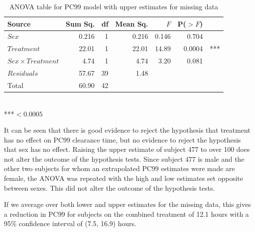 \begin{table}[h]
\centering
\caption{ANOVA table for PC99 model with upper estimates for missing data}\label{aov99high}
\begin{tabular}{l|rrrrrl}
Source&Sum Sq.&df&Mean Sq.&$F$&P($>F$)\\
\hline
$Sex$				& 0.216 & 1 & 0.216 & 0.146 & 0.704 & \\
$Treatment$			& 22.01   & 1 & 22.01   & 14.89   & 0.0004 &*** \\
$Sex\times Treatment$	& 4.74   & 1 & 4.74   & 3.20   & 0.081 & \\
$Residuals$			& 57.67 & 39 & 1.48 &&&\\
\hline
Total&60.90&42&&&
\end{tabular}\\
***$<0.0005$
\end{table}

It can be seen that there is good evidence to reject the hypothesis that treatment has no effect on PC99 clearance time, but no evidence to reject the hypothesis that sex has no effect. Raising the upper estimate of subject 477 to over 100 does not alter the outcome of the hypothesis tests. Since subject 477 is male and the other two subjects for whom an extrapolated PC99 estimates were made are female, the ANOVA was repeated with the high and low estimates set opposite between sexes. This did not alter the outcome of the hypothesis tests.

If we average over both lower and upper estimates for the missing data, this gives a reduction in PC99 for subjects on the combined treatment of 12.1 hours with a 95\% confidence interval of (7.5, 16.9) hours.

